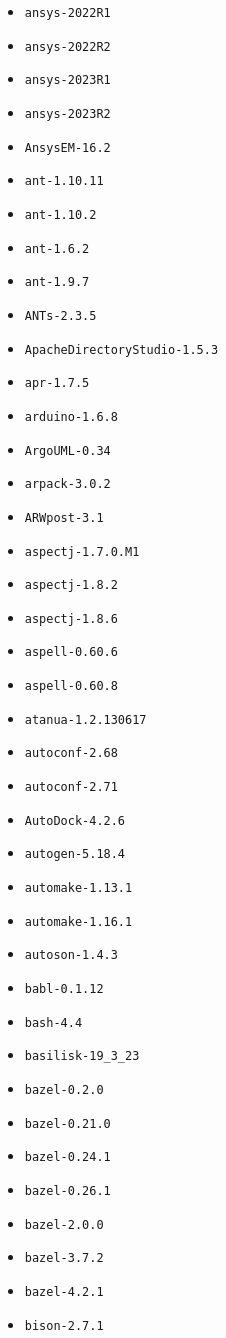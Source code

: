 \begin{multicols}{3}
\begin{itemize}
\item \verb|ansys-2022R1|
\item \verb|ansys-2022R2|
\item \verb|ansys-2023R1|
\item \verb|ansys-2023R2|
\item \verb|AnsysEM-16.2|
\item \verb|ant-1.10.11|
\item \verb|ant-1.10.2|
\item \verb|ant-1.6.2|
\item \verb|ant-1.9.7|
\item \verb|ANTs-2.3.5|
\item \verb|ApacheDirectoryStudio-1.5.3|
\item \verb|apr-1.7.5|
\item \verb|arduino-1.6.8|
\item \verb|ArgoUML-0.34|
\item \verb|arpack-3.0.2|
\item \verb|ARWpost-3.1|
\item \verb|aspectj-1.7.0.M1|
\item \verb|aspectj-1.8.2|
\item \verb|aspectj-1.8.6|
\item \verb|aspell-0.60.6|
\item \verb|aspell-0.60.8|
\item \verb|atanua-1.2.130617|
\item \verb|autoconf-2.68|
\item \verb|autoconf-2.71|
\item \verb|AutoDock-4.2.6|
\item \verb|autogen-5.18.4|
\item \verb|automake-1.13.1|
\item \verb|automake-1.16.1|
\item \verb|autoson-1.4.3|
\item \verb|babl-0.1.12|
\item \verb|bash-4.4|
\item \verb|basilisk-19_3_23|
\item \verb|bazel-0.2.0|
\item \verb|bazel-0.21.0|
\item \verb|bazel-0.24.1|
\item \verb|bazel-0.26.1|
\item \verb|bazel-2.0.0|
\item \verb|bazel-3.7.2|
\item \verb|bazel-4.2.1|
\item \verb|bison-2.7.1|

\end{itemize}
\end{multicols}
